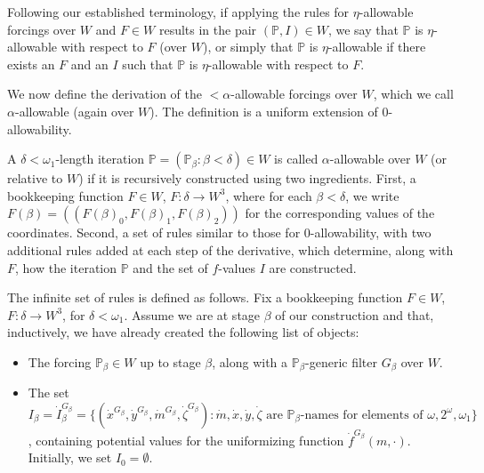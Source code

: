 \documentclass[a4paper,11pt]{article}
\newcommand{\forceP}{\mathbb{P}}
\begin{document}
Following our established terminology, if applying the rules for \( \eta \)-allowable forcings over \( W \) and \( F \in W \) results in the pair \( (\forceP, I) \in W \), we say that \( \forceP \) is \( \eta \)-allowable with respect to \( F \) (over \( W \)), or simply that \( \forceP \) is \( \eta \)-allowable if there exists an \( F \) and an \( I \) such that \( \forceP \) is \( \eta \)-allowable with respect to \( F \).


We now define the derivation of the \( <\alpha \)-allowable forcings over \( W \), which we call \( \alpha \)-allowable (again over \( W \)). The definition is a uniform extension of 0-allowability. 

A \( \delta < \omega_1 \)-length iteration \( \forceP = (\forceP_{\beta} : \beta < \delta) \in W \) is called \( \alpha \)-allowable over \( W \) (or relative to \( W \)) if it is recursively constructed using two ingredients. First, a bookkeeping function \( F \in W \), \( F : \delta \to W^3 \), where for each \( \beta < \delta \), we write \( F(\beta) = ((F(\beta)_0, F(\beta)_1, F(\beta)_2)) \) for the corresponding values of the coordinates. Second, a set of rules similar to those for 0-allowability, with two additional rules added at each step of the derivative, which determine, along with \( F \), how the iteration \( \forceP \) and the set of \( f \)-values \( I \) are constructed.

The infinite set of rules is defined as follows. Fix a bookkeeping function \( F \in W \), \( F : \delta \to W^3 \), for \( \delta < \omega_1 \). Assume we are at stage \( \beta \) of our construction and that, inductively, we have already created the following list of objects:

\begin{itemize}
\item The forcing \( \forceP_{\beta} \in W \) up to stage \( \beta \), along with a \( \forceP_{\beta} \)-generic filter \( G_{\beta} \) over \( W \).
  
\item The set \( I_{\beta} = \dot{I}_{\beta}^{G_{\beta}} = \{ (\dot{x}^{G_{\beta}}, \dot{y}^{G_{\beta}}, \dot{m}^{G_{\beta}}, \dot{\zeta}^{G_{\beta}}) : \dot{m}, \dot{x}, \dot{y}, \dot{\zeta} \text{ are } \forceP_{\beta} \text{-names for elements of } \omega, 2^{\omega}, \omega_1 \} \), containing potential values for the uniformizing function \( \dot{f}^{G_{\beta}}(m, \cdot) \). Initially, we set \( I_0 = \emptyset \).
\end{itemize}
\end{document}
